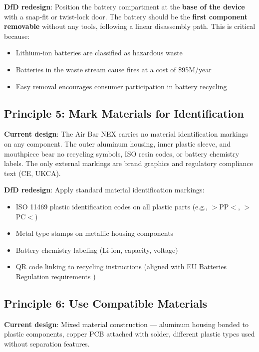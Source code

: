 \textbf{DfD redesign}: Position the battery compartment at the \textbf{base of the device} with a snap-fit or twist-lock door. The battery should be the \textbf{first component removable} without any tools, following a linear disassembly path. This is critical because:
\begin{itemize}
    \item Lithium-ion batteries are classified as hazardous waste
    \item Batteries in the waste stream cause fires at a cost of \$95M/year \cite{wmw2025}
    \item Easy removal encourages consumer participation in battery recycling
\end{itemize}

\subsection{Principle 5: Mark Materials for Identification}

\textbf{Current design}: The Air Bar NEX carries no material identification markings on any component. The outer aluminum housing, inner plastic sleeve, and mouthpiece bear no recycling symbols, ISO resin codes, or battery chemistry labels. The only external markings are brand graphics and regulatory compliance text (CE, UKCA).

\textbf{DfD redesign}: Apply standard material identification markings:
\begin{itemize}
    \item ISO 11469 plastic identification codes on all plastic parts (e.g., $>$PP$<$, $>$PC$<$)
    \item Metal type stamps on metallic housing components
    \item Battery chemistry labeling (Li-ion, capacity, voltage)
    \item QR code linking to recycling instructions (aligned with EU Batteries Regulation requirements \cite{eu_batteries_2023})
\end{itemize}

\subsection{Principle 6: Use Compatible Materials}

\textbf{Current design}: Mixed material construction --- aluminum housing bonded to plastic components, copper PCB attached with solder, different plastic types used without separation features.

